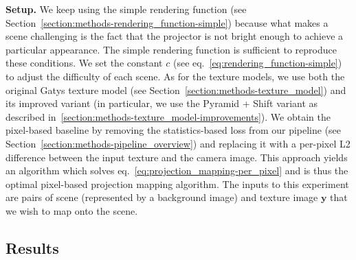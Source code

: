 \textbf{Setup.} We keep using the simple rendering function (see Section~\ref{section:methods-rendering_function-simple}) because what makes a scene challenging is the fact that the projector is not bright enough to achieve a particular appearance. The simple rendering function is sufficient to reproduce these conditions. We set the constant \(c\) (see eq.~\ref{eq:rendering_function-simple}) to adjust the difficulty of each scene. As for the texture models, we use both the original Gatys texture model (see Section~\ref{section:methods-texture_model}) and its improved variant (in particular, we use the Pyramid + Shift variant as described in~\ref{section:methods-texture_model-improvements}). We obtain the pixel-based baseline by removing the statistics-based loss from our pipeline (see Section~\ref{section:methods-pipeline_overview}) and replacing it with a per-pixel L2 difference between the input texture and the camera image. This approach yields an algorithm which solves eq.~\ref{eq:projection_mapping-per_pixel} and is thus the optimal pixel-based projection mapping algorithm. The inputs to this experiment are pairs of scene (represented by a background image) and texture image \(\bm{y}\) that we wish to map onto the scene.

\subsection{Results}
\label{section:results-experiments-02-results}

